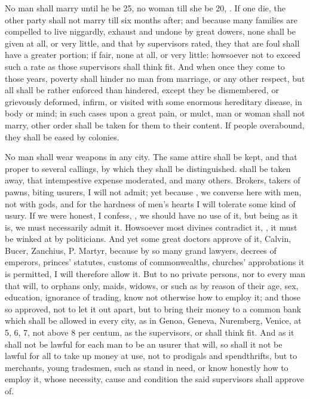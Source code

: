 No man shall marry until he be 25, no woman till she be 20,
. If one
die, the other party shall not marry till six months after;
and because many families are compelled to live niggardly, exhaust and undone
by great dowers, none shall be given at all, or very
little, and that by supervisors rated, they that are foul shall have a greater
portion; if fair, none at all, or very little: howsoever
not to exceed such a rate as those supervisors shall think fit. And when once
they come to those years, poverty shall hinder no man from marriage, or any
other respect, but all shall be rather enforced than
hindered, except they be dismembered,
or grievously deformed, infirm, or visited with some enormous hereditary
disease, in body or mind; in such cases upon a great pain, or mulct,
man or woman shall not marry, other order shall be taken
for them to their content. If people overabound, they shall be eased by
colonies.

No man shall wear weapons in any city. The same attire
shall be kept, and that proper to several callings, by which they shall be
distinguished.  shall be taken away, that
intempestive expense moderated, and many others. Brokers, takers of pawns,
biting usurers, I will not admit; yet because , we converse here with men, not with gods, and for the hardness of
men's hearts I will tolerate some kind of usury. If we were
honest, I confess, , we should have no use of it, but
being as it is, we must necessarily admit it. Howsoever most divines contradict
it, , it must be winked at by
politicians. And yet some great doctors approve of it, Calvin, Bucer, Zanchius,
P. Martyr, because by so many grand lawyers, decrees of emperors, princes'
statutes, customs of commonwealths, churches' approbations it is permitted,
\etc{} I will therefore allow it. But to no private persons, nor to every man
that will, to orphans only, maids, widows, or such as by reason of their age,
sex, education, ignorance of trading, know not otherwise how to employ it; and
those so approved, not to let it out apart, but to bring their money to a
common bank which shall be allowed in every city, as in
Genoa, Geneva, Nuremberg, Venice, at 5, 6, 7, not above 8
per centum, as the supervisors, or  shall think fit.
And as it shall not be lawful for each man to be an usurer
that will, so shall it not be lawful for all to take up money at use, not to
prodigals and spendthrifts, but to merchants, young tradesmen, such as stand in
need, or know honestly how to employ it, whose necessity, cause and condition
the said supervisors shall approve of.

